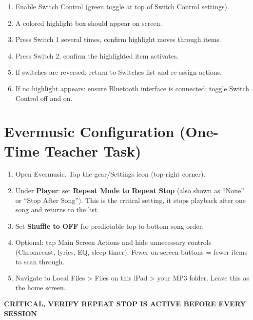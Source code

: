 \documentclass[justified,openright]{tufte-book}
\begin{document}
\begin{enumerate}
\item
  Enable Switch Control (green toggle at top of Switch Control
  settings).
\item
  A colored highlight box should appear on screen.
\item
  Press Switch 1 several times, confirm highlight moves through
  items.
\item
  Press Switch 2, confirm the highlighted item activates.
\item
  If switches are reversed: return to Switches list and re-assign
  actions.
\item
  If no highlight appears: ensure Bluetooth interface is connected;
  toggle Switch Control off and on.
\end{enumerate}

\section{Evermusic Configuration (One-Time Teacher
Task)}\label{evermusic-configuration-one-time-teacher-task}

\begin{enumerate}
\item
  Open Evermusic. Tap the gear/Settings icon (top-right corner).
\item
  Under \textbf{Player}: set \textbf{Repeat Mode to Repeat Stop} (also
  shown as ``None'' or ``Stop After Song''). This is the critical
  setting, it stops playback after one song and returns to the list.
\item
  Set \textbf{Shuffle to OFF} for predictable top-to-bottom song order.
\item
  Optional: tap Main Screen Actions and hide unnecessary controls
  (Chromecast, lyrics, EQ, sleep timer). Fewer on-screen buttons = fewer
  items to scan through.
\item
  Navigate to Local Files \textgreater{} Files on this iPad
  \textgreater{} your MP3 folder. Leave this as the home screen.
\end{enumerate}


\textbf{CRITICAL, VERIFY REPEAT STOP IS ACTIVE BEFORE EVERY SESSION}
\end{document}
